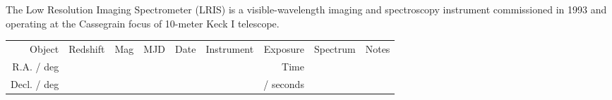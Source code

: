 \documentclass[a4paper,fleqn,usenatbib]{mnras}
\begin{document}
The Low Resolution Imaging Spectrometer (LRIS) is a visible-wavelength
imaging and spectroscopy instrument commissioned in 1993 and operating
at the Cassegrain focus of 10-meter Keck I telescope. 

\begin{table*}
 \centering
 \begin{tabular}{r  r  r r r   r r r r}
  \hline \hline 
   Object                         & \multirow{3}{*}{Redshift} & \multirow{3}{*}{Mag}      & \multirow{3}{*}{MJD} & \multirow{3}{*}{Date}  & \multirow{3}{*}{Instrument}   & Exposure    & \multirow{3}{*}{Spectrum} & \multirow{3}{*}{Notes} \\
   R.A. / deg                   &               &               &            &                                &                                                                       &  Time         & & \\
   Decl. / deg                 &               &               &            &                                &                                                                       &  / seconds         & & \\


\end{tabular}
\end{table*}
\end{document}
